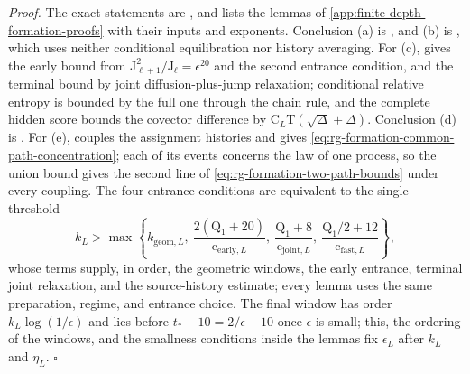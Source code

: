\noindent\emph{Proof.}
The exact statements are
,
and  lists the lemmas of
\cref{app:finite-depth-formation-proofs} with their inputs and exponents.
Conclusion (a) is
,
and (b) is , which uses neither conditional
equilibration nor history averaging. For (c),
 gives the early bound from
\(\mathrm J_{\ell+1}^2/\mathrm J_\ell=\epsilon^{20}\) and the second entrance
condition, and  the terminal bound
by joint diffusion-plus-jump relaxation; conditional relative entropy is
bounded by the full one through the chain rule, and the complete hidden score
bounds the covector difference by
\(\mathrm C_L\mathrm T(\sqrt\Delta+\Delta)\). Conclusion (d) is
. For (e),
 couples the assignment histories and
 gives
\cref{eq:rg-formation-common-path-concentration}; each of its events concerns
the law of one process, so the union bound gives the second line of
\cref{eq:rg-formation-two-path-bounds} under every coupling. The four
entrance conditions are equivalent to the single threshold
\begin{equation}
k_L>\max\left\{k_{\mathrm{geom},L},\
\frac{2(\mathrm Q_1+20)}{\mathrm c_{\mathrm{early},L}},\
\frac{\mathrm Q_1+8}{\mathrm c_{\mathrm{joint},L}},\
\frac{\mathrm Q_1/2+12}{\mathrm c_{\mathrm{fast},L}}\right\},
\label{eq:rg-formation-joined-entrance-proof}
\end{equation}
whose terms supply, in order, the geometric windows, the early entrance,
terminal joint relaxation, and the source-history estimate; every lemma uses
the same preparation, regime, and entrance choice. The final window has order
\(k_L\log(1/\epsilon)\) and lies before \(t_*-10=2/\epsilon-10\) once
\(\epsilon\) is small; this, the ordering of the windows, and the smallness
conditions inside the lemmas fix \(\epsilon_L\) after \(k_L\) and \(\eta_L\).
\(\square\)

